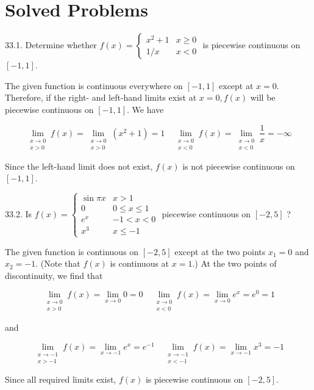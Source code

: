 \documentclass[10pt]{article}
\begin{document}
\section*{Solved Problems}
33.1. Determine whether $f(x)=\left\{\begin{array}{cc}x^{2}+1 & x \geq 0 \\ 1 / x & x<0\end{array}\right.$ is piecewise continuous on $[-1,1]$.

The given function is continuous everywhere on $[-1,1]$ except at $x=0$. Therefore, if the right- and left-hand limits exist at $x=0, f(x)$ will be piecewise continuous on $[-1,1]$. We have

$$
\lim _{\substack{x \rightarrow 0 \\ x>0}} f(x)=\lim _{\substack{x \rightarrow 0 \\ x>0}}\left(x^{2}+1\right)=1 \quad \lim _{\substack{x \rightarrow 0 \\ x<0}} f(x)=\lim _{\substack{x \rightarrow 0 \\ x<0}} \frac{1}{x}=-\infty
$$

Since the left-hand limit does not exist, $f(x)$ is not piecewise continuous on $[-1,1]$.

33.2. Is $f(x)=\left\{\begin{array}{cc}\sin \pi x & x>1 \\ 0 & 0 \leq x \leq 1 \\ e^{x} & -1<x<0 \\ x^{3} & x \leq-1\end{array}\right.$ piecewise continuous on $[-2,5]$ ?

The given function is continuous on $[-2,5]$ except at the two points $x_{1}=0$ and $x_{2}=-1$. (Note that $f(x)$ is continuous at $x=1$.) At the two points of discontinuity, we find that

$$
\lim _{\substack{x \rightarrow 0 \\ x>0}} f(x)=\lim _{x \rightarrow 0} 0=0 \quad \lim _{\substack{x \rightarrow 0 \\ x<0}} f(x)=\lim _{x \rightarrow 0} e^{x}=e^{0}=1
$$

and

$$
\lim _{\substack{x \rightarrow-1 \\ x>-1}} f(x)=\lim _{x \rightarrow-1} e^{x}=e^{-1} \quad \lim _{\substack{x \rightarrow-1 \\ x<-1}} f(x)=\lim _{x \rightarrow-1} x^{3}=-1
$$

Since all required limits exist, $f(x)$ is piecewise continuous on $[-2,5]$.
\end{document}

